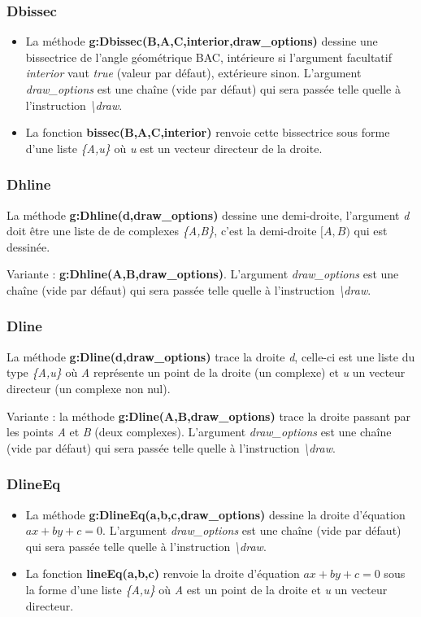 \subsubsection{Dbissec}
\begin{itemize}
    \item La méthode \textbf{g:Dbissec(B,A,C,interior,draw\_options)} dessine une bissectrice de l'angle géométrique BAC, intérieure si l'argument facultatif \emph{interior} vaut \emph{true} (valeur par défaut), extérieure sinon. L'argument \emph{draw\_options} est une chaîne (vide par défaut) qui sera passée telle quelle à l'instruction
  \emph{\textbackslash draw}.
  \item La fonction \textbf{bissec(B,A,C,interior)} renvoie cette bissectrice sous forme d'une liste \emph{\{A,u\}} où \emph{u} est un vecteur directeur de la droite.
\end{itemize}

\subsubsection{Dhline}
La méthode \textbf{g:Dhline(d,draw\_options)} dessine une demi-droite, l'argument \emph{d} doit être une liste de de complexes \emph{\{A,B\}}, c'est la demi-droite $[A,B)$ qui est dessinée.

Variante : \textbf{g:Dhline(A,B,draw\_options)}. L'argument \emph{draw\_options} est une chaîne (vide par défaut) qui sera passée telle quelle à l'instruction \emph{\textbackslash draw}.

\subsubsection{Dline}
La méthode \textbf{g:Dline(d,draw\_options)} trace la droite \emph{d}, celle-ci est une liste du type \emph{\{A,u\}} où \emph{A} représente un point de la droite (un complexe) et \emph{u} un vecteur directeur (un complexe non nul). 

Variante : la méthode \textbf{g:Dline(A,B,draw\_options)} trace la droite passant par les points \emph{A} et \emph{B} (deux complexes). L'argument \emph{draw\_options} est une chaîne (vide par défaut) qui sera passée telle quelle à l'instruction \emph{\textbackslash draw}.

\subsubsection{DlineEq}
\begin{itemize}
    \item La méthode \textbf{g:DlineEq(a,b,c,draw\_options)} dessine la droite d'équation \(ax+by+c=0\). L'argument \emph{draw\_options} est une chaîne (vide par défaut) qui sera passée telle quelle à l'instruction \emph{\textbackslash draw}.
    \item La fonction \textbf{lineEq(a,b,c)} renvoie la droite d'équation \(ax+by+c=0\) sous la forme d'une liste \emph{\{A,u\}} où \emph{A} est un point de la droite et \emph{u} un vecteur directeur.
\end{itemize}

